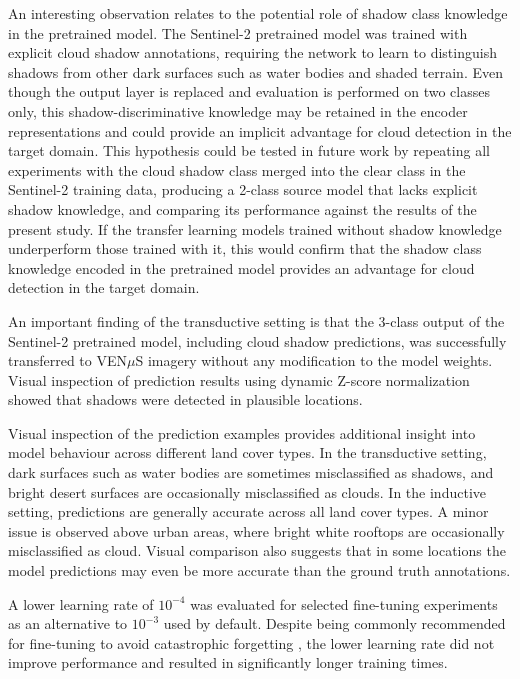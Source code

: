 An interesting observation relates to the potential role of shadow class knowledge in the pretrained model. The Sentinel-2 pretrained model was trained with explicit cloud shadow annotations, requiring the network to learn to distinguish shadows from other dark surfaces such as water bodies and shaded terrain. Even though the output layer is replaced and evaluation is performed on two classes only, this shadow-discriminative knowledge may be retained in the encoder representations and could provide an implicit advantage for cloud detection in the target domain. This hypothesis could be tested in future work by repeating all experiments with the cloud shadow class merged into the clear class in the Sentinel-2 training data, producing a 2-class source model that lacks explicit shadow knowledge, and comparing its performance against the results of the present study. If the transfer learning models trained without shadow knowledge underperform those trained with it, this would confirm that the shadow class knowledge encoded in the pretrained model provides an advantage for cloud detection in the target domain.

An important finding of the transductive setting is that the 3-class output of the Sentinel-2 pretrained model, including cloud shadow predictions, was successfully transferred to VEN$\mu$S imagery without any modification to the model weights. Visual inspection of prediction results using dynamic Z-score normalization showed that shadows were detected in plausible locations.

Visual inspection of the prediction examples provides additional insight into model behaviour across different land cover types. In the transductive setting, dark surfaces such as water bodies are sometimes misclassified as shadows, and bright desert surfaces are occasionally misclassified as clouds. In the inductive setting, predictions are generally accurate across all land cover types. A minor issue is observed above urban areas, where bright white rooftops are occasionally misclassified as cloud. Visual comparison also suggests that in some locations the model predictions may even be more accurate than the ground truth annotations.

A lower learning rate of $10^{-4}$ was evaluated for selected fine-tuning experiments as an alternative to $10^{-3}$ used by default. Despite being commonly recommended for fine-tuning to avoid catastrophic forgetting \cite{goodfellow2016}, the lower learning rate did not improve performance and resulted in significantly longer training times.

